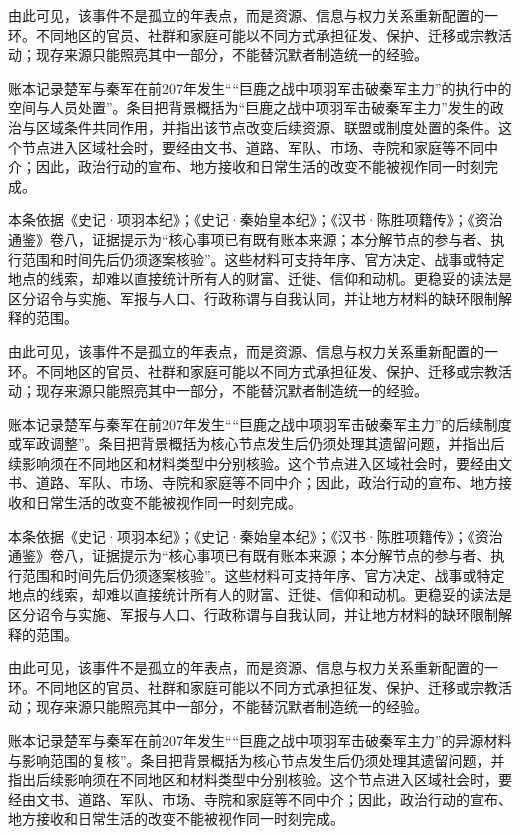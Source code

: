 由此可见，该事件不是孤立的年表点，而是资源、信息与权力关系重新配置的一环。不同地区的官员、社群和家庭可能以不同方式承担征发、保护、迁移或宗教活动；现存来源只能照亮其中一部分，不能替沉默者制造统一的经验。

账本记录楚军与秦军在前207年发生““巨鹿之战中项羽军击破秦军主力”的执行中的空间与人员处置”。条目把背景概括为“巨鹿之战中项羽军击破秦军主力”发生的政治与区域条件共同作用，并指出该节点改变后续资源、联盟或制度处置的条件。这个节点进入区域社会时，要经由文书、道路、军队、市场、寺院和家庭等不同中介；因此，政治行动的宣布、地方接收和日常生活的改变不能被视作同一时刻完成。

本条依据《史记·项羽本纪》；《史记·秦始皇本纪》；《汉书·陈胜项籍传》；《资治通鉴》卷八，证据提示为“核心事项已有既有账本来源；本分解节点的参与者、执行范围和时间先后仍须逐案核验”。这些材料可支持年序、官方决定、战事或特定地点的线索，却难以直接统计所有人的财富、迁徙、信仰和动机。更稳妥的读法是区分诏令与实施、军报与人口、行政称谓与自我认同，并让地方材料的缺环限制解释的范围。

由此可见，该事件不是孤立的年表点，而是资源、信息与权力关系重新配置的一环。不同地区的官员、社群和家庭可能以不同方式承担征发、保护、迁移或宗教活动；现存来源只能照亮其中一部分，不能替沉默者制造统一的经验。

账本记录楚军与秦军在前207年发生““巨鹿之战中项羽军击破秦军主力”的后续制度或军政调整”。条目把背景概括为核心节点发生后仍须处理其遗留问题，并指出后续影响须在不同地区和材料类型中分别核验。这个节点进入区域社会时，要经由文书、道路、军队、市场、寺院和家庭等不同中介；因此，政治行动的宣布、地方接收和日常生活的改变不能被视作同一时刻完成。

本条依据《史记·项羽本纪》；《史记·秦始皇本纪》；《汉书·陈胜项籍传》；《资治通鉴》卷八，证据提示为“核心事项已有既有账本来源；本分解节点的参与者、执行范围和时间先后仍须逐案核验”。这些材料可支持年序、官方决定、战事或特定地点的线索，却难以直接统计所有人的财富、迁徙、信仰和动机。更稳妥的读法是区分诏令与实施、军报与人口、行政称谓与自我认同，并让地方材料的缺环限制解释的范围。

由此可见，该事件不是孤立的年表点，而是资源、信息与权力关系重新配置的一环。不同地区的官员、社群和家庭可能以不同方式承担征发、保护、迁移或宗教活动；现存来源只能照亮其中一部分，不能替沉默者制造统一的经验。

账本记录楚军与秦军在前207年发生““巨鹿之战中项羽军击破秦军主力”的异源材料与影响范围的复核”。条目把背景概括为核心节点发生后仍须处理其遗留问题，并指出后续影响须在不同地区和材料类型中分别核验。这个节点进入区域社会时，要经由文书、道路、军队、市场、寺院和家庭等不同中介；因此，政治行动的宣布、地方接收和日常生活的改变不能被视作同一时刻完成。

